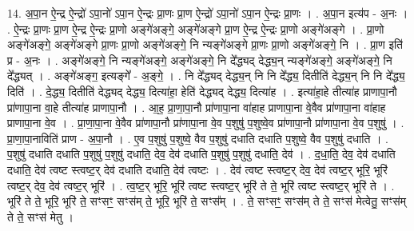 \documentclass[17pt]{extarticle}
\begin{document}
14. अ॒पा॒न ऐ॒न्द्र ऐ॒न्द्रो॑ ऽपा॒नो॑ ऽपा॒न ऐ॒न्द्रः प्रा॒णः प्रा॒ण ऐ॒न्द्रो॑ ऽपा॒नो॑ ऽपा॒न ऐ॒न्द्रः प्रा॒णः । . अ॒पा॒न इत्य॑प - अ॒नः । . ऐ॒न्द्रः प्रा॒णः प्रा॒ण ऐ॒न्द्र ऐ॒न्द्रः प्रा॒णो अङ्गे॑अङ्गे॒ अङ्गे॑अङ्गे प्रा॒ण ऐ॒न्द्र ऐ॒न्द्रः प्रा॒णो अङ्गे॑अङ्गे । . प्रा॒णो अङ्गे॑अङ्गे॒ अङ्गे॑अङ्गे प्रा॒णः प्रा॒णो अङ्गे॑अङ्गे॒ नि न्यङ्गे॑अङ्गे प्रा॒णः प्रा॒णो अङ्गे॑अङ्गे॒ नि । . प्रा॒ण इति॑ प्र - अ॒नः । . अङ्गे॑अङ्गे॒ नि न्यङ्गे॑अङ्गे॒ अङ्गे॑अङ्गे॒ नि दे᳚द्ध्यद् देद्ध्य॒न् न्यङ्गे॑अङ्गे॒ अङ्गे॑अङ्गे॒ नि दे᳚द्ध्यत् । . अङ्गे॑अङ्ग॒ इत्यङ्गे᳚ - अ॒ङ्गे॒ । . नि दे᳚द्ध्यद् देद्ध्य॒न् नि नि दे᳚द्ध्य॒ दितीति॑ देद्ध्य॒न् नि नि दे᳚द्ध्य॒ दिति॑ । . दे॒द्ध्य॒ दितीति॑ देद्ध्यद् देद्ध्य॒ दित्या॑हा॒ हेति॑ देद्ध्यद् देद्ध्य॒ दित्या॑ह । . इत्या॑हा॒हे तीत्या॑ह प्राणापा॒नौ प्रा॑णापा॒ना वा॒हे तीत्या॑ह प्राणापा॒नौ । . आ॒ह॒ प्रा॒णा॒पा॒नौ प्रा॑णापा॒ना वा॑हाह प्राणापा॒ना वे॒वैव प्रा॑णापा॒ना वा॑हाह प्राणापा॒ना वे॒व । . प्रा॒णा॒पा॒ना वे॒वैव प्रा॑णापा॒नौ प्रा॑णापा॒ना वे॒व प॒शुषु॑ प॒शुष्वे॒व प्रा॑णापा॒नौ प्रा॑णापा॒ना वे॒व प॒शुषु॑ । . प्रा॒णा॒पा॒नाविति॑ प्राण - अ॒पा॒नौ । . ए॒व प॒शुषु॑ प॒शुष्वे॒ वैव प॒शुषु॑ दधाति दधाति प॒शुष्वे॒ वैव प॒शुषु॑ दधाति । . प॒शुषु॑ दधाति दधाति प॒शुषु॑ प॒शुषु॑ दधाति॒ देव॒ देव॑ दधाति प॒शुषु॑ प॒शुषु॑ दधाति॒ देव॑ । . द॒धा॒ति॒ देव॒ देव॑ दधाति दधाति॒ देव॑ त्वष्ट स्त्वष्ट॒र् देव॑ दधाति दधाति॒ देव॑ त्वष्टः । . देव॑ त्वष्ट स्त्वष्ट॒र् देव॒ देव॑ त्वष्ट॒र् भूरि॒ भूरि॑ त्वष्ट॒र् देव॒ देव॑ त्वष्ट॒र् भूरि॑ । . त्व॒ष्ट॒र् भूरि॒ भूरि॑ त्वष्ट स्त्वष्ट॒र् भूरि॑ ते ते॒ भूरि॑ त्वष्ट स्त्वष्ट॒र् भूरि॑ ते । . भूरि॑ ते ते॒ भूरि॒ भूरि॑ ते॒ सꣳसꣳ॒॒ सꣳस॑म् ते॒ भूरि॒ भूरि॑ ते॒ सꣳस᳚म् । . ते॒ सꣳसꣳ॒॒ सꣳस॑म् ते ते॒ सꣳस॑ मेत्वेतु॒ सꣳस॑म् ते ते॒ सꣳस॑ मेतु । \newline
\end{document}
